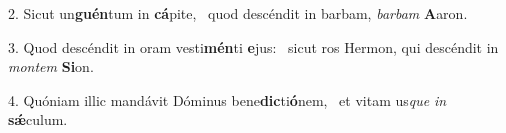 2. Sicut un\textbf{guén}tum in \textbf{cá}pite, \ast\  quod descéndit in barbam, \textit{bar}\textit{bam} \textbf{A}aron.\

3. Quod descéndit in oram vesti\textbf{mén}ti \textbf{e}jus: \ast\  sicut ros Hermon, qui descéndit in \textit{mon}\textit{tem} \textbf{Si}on.\

4. Quóniam illic mandávit Dóminus bene\textbf{dic}ti\textbf{ó}nem, \ast\  et vitam us\textit{que} \textit{in} \textbf{sǽ}culum.\

